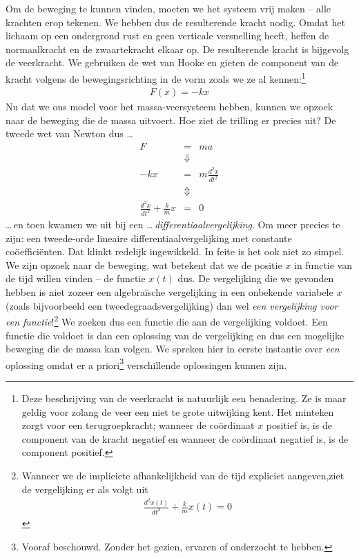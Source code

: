 \documentclass{ximera}
\begin{document}
	Om de beweging te kunnen vinden, moeten we het systeem vrij maken -- alle krachten erop tekenen. We hebben dus de resulterende kracht nodig. Omdat het lichaam op een ondergrond rust en geen verticale versnelling heeft, heffen de normaalkracht en de zwaartekracht elkaar op. De resulterende kracht is bijgevolg de veerkracht. We gebruiken de wet van Hooke en gieten de component van de kracht volgens de bewegingsrichting in de vorm zoals we ze al kennen:\footnote{Deze beschrijving van de veerkracht is natuurlijk een benadering. Ze is maar geldig voor zolang de veer een niet te grote uitwijking kent. Het minteken zorgt voor een terugroepkracht; wanneer de coördinaat $x$ positief is, is de component van de kracht negatief en wanneer de coördinaat negatief is, is de component positief.}
	\begin{eqnarray*}
	F(x)=-kx
	\end{eqnarray*}
	Nu dat we ons model voor het massa-veersysteem hebben, kunnen we opzoek naar de beweging die de massa uitvoert. Hoe ziet de trilling er precies uit? De tweede wet van Newton dus \ldots
	\begin{eqnarray}
	F&=&ma\nonumber\\
	&\Downarrow&\nonumber\\
	-kx&=&m\frac{d^2x}{dt^2}\nonumber\\
	&\Updownarrow&\nonumber\\
	\frac{d^2x}{dt^2}+\frac{k}{m}x&=&0
	\end{eqnarray}
	\ldots\,en toen kwamen we uit bij een \ldots\,\emph{differentiaalvergelijking}. Om meer precies te zijn: een tweede-orde lineaire differentiaalvergelijking met constante coöefficiënten. Dat klinkt redelijk ingewikkeld. In feite is het ook niet zo simpel. We zijn opzoek naar de beweging, wat betekent dat we de positie $x$ in functie van de tijd willen vinden -- de functie $x(t)$ dus. De vergelijking die we gevonden hebben is niet zozeer een algebra\"ische vergelijking in een onbekende variabele $x$ (zoals bijvoorbeeld een tweedegraadsvergelijking) dan wel \emph{een vergelijking voor een functie}!\footnote{Wanneer we de impliciete afhankelijkheid van de tijd expliciet aangeven,ziet de vergelijking er als volgt uit
	\begin{eqnarray*}
	\frac{d^2x(t)}{dt^2}+\frac{k}{m}x(t)=0
	\end{eqnarray*}} We zoeken dus een functie die aan de vergelijking voldoet. Een functie die voldoet is dan een oplossing van de vergelijking en dus een mogelijke beweging die de massa kan volgen. We spreken hier in eerste instantie over \emph{een} oplossing omdat er a priori\footnote{Vooraf beschouwd. Zonder het gezien, ervaren of onderzocht te hebben.} verschillende oplossingen kunnen zijn.
	
\end{document}
